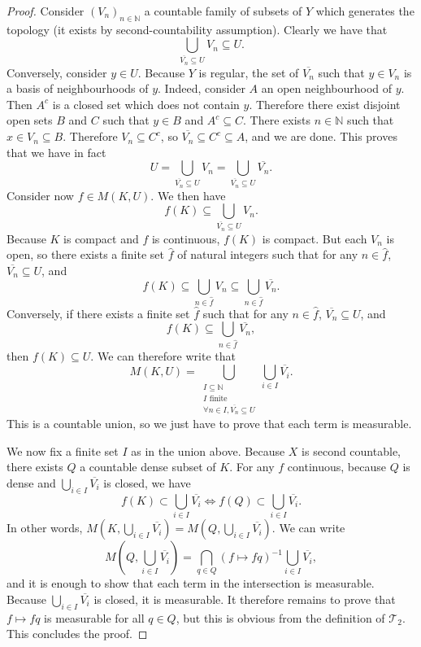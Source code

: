 \begin{proof}
Consider $(V_n)_{n \in \mathbb{N}}$ a countable family of subsets of $Y$ which generates the topology (it exists by second-countability assumption). Clearly we have that
$$\bigcup_{\overline{V_n} \subseteq U} V_n \subseteq U.$$
Conversely, consider $y \in U$. Because $Y$ is regular, the set of $\overline{V_n}$ such that $y \in V_n$ is a basis of neighbourhoods of $y$. Indeed, consider $A$ an open neighbourhood of $y$. Then $A^c$ is a closed set which does not contain $y$. Therefore there exist disjoint open sets $B$ and $C$ such that $y \in B$ and $A^c \subseteq C$. There exists $n \in \mathbb{N}$ such that $x \in V_n \subseteq B$. Therefore $V_n \subseteq C^c$, so $\overline{V_n} \subseteq C^c \subseteq A$, and we are done. This proves that we have in fact
$$U = \bigcup_{\overline{V_n} \subseteq U} V_n = \bigcup_{\overline{V_n} \subseteq U} \overline{V_n}.$$
Consider now $f \in M(K, U)$. We then have
$$f(K) \subseteq \bigcup_{\overline{V_n} \subseteq U} V_n.$$
Because $K$ is compact and $f$ is continuous, $f(K)$ is compact. But each $V_n$ is open, so there exists a finite set $\hat{f}$ of natural integers such that for any $n \in \hat{f}$, $\overline{V_n} \subseteq U$, and
$$f(K) \subseteq \bigcup_{n \in \hat{f}} V_n \subseteq \bigcup_{n \in \hat{f}} \overline{V_n}.$$
Conversely, if there exists a finite set $\hat{f}$ such that for any $n \in \hat{f}$, $\overline{V_n} \subseteq U$, and
$$f(K) \subseteq \bigcup_{n \in \hat{f}} \overline{V_n},$$
then $f(K) \subseteq U$. We can therefore write that
$$M(K, U) = \bigcup_{\substack{I \subseteq \mathbb{N} \\ I \text{ finite} \\ \forall n \in I, \overline{V_n} \subseteq U}} \bigcup_{i \in I} \overline{V_i}.$$
This is a countable union, so we just have to prove that each term is measurable.

We now fix a finite set $I$ as in the union above. Because $X$ is second countable, there exists $Q$ a countable dense subset of $K$. For any $f$ continuous, because $Q$ is dense and $\bigcup_{i \in I} \overline{V_i}$ is closed, we have
$$f(K) \subset \bigcup_{i \in I} \overline{V_i} \Longleftrightarrow f(Q) \subset \bigcup_{i \in I} \overline{V_i}.$$
In other words, $M\left(K, \bigcup_{i \in I} \overline{V_i}\right) = M\left(Q, \bigcup_{i \in I} \overline{V_i}\right)$. We can write
$$M\left(Q, \bigcup_{i \in I} \overline{V_i}\right) = \bigcap_{q \in Q} (f \mapsto f q)^{-1} \bigcup_{i \in I} \overline{V_i},$$
and it is enough to show that each term in the intersection is measurable. Because $\bigcup_{i \in I} \overline{V_i}$ is closed, it is measurable. It therefore remains to prove that $f \mapsto f q$ is measurable for all $q \in Q$, but this is obvious from the definition of $\mathcal{T}_2$. This concludes the proof.
\end{proof}


